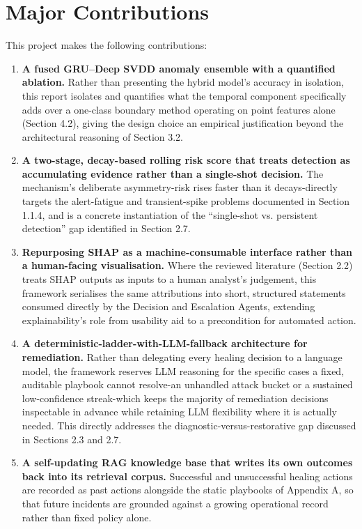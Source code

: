 \section{Major Contributions}

This project makes the following contributions:

\begin{enumerate}
\item \textbf{A fused GRU--Deep SVDD anomaly ensemble with a quantified ablation.} Rather than presenting the hybrid model's accuracy in isolation, this report isolates and quantifies what the temporal component specifically adds over a one-class boundary method operating on point features alone (Section 4.2), giving the design choice an empirical justification beyond the architectural reasoning of Section 3.2.

\item \textbf{A two-stage, decay-based rolling risk score that treats detection as accumulating evidence rather than a single-shot decision.} The mechanism's deliberate asymmetry-risk rises faster than it decays-directly targets the alert-fatigue and transient-spike problems documented in Section 1.1.4, and is a concrete instantiation of the ``single-shot vs. persistent detection'' gap identified in Section 2.7.

\item \textbf{Repurposing SHAP as a machine-consumable interface rather than a human-facing visualisation.} Where the reviewed literature (Section 2.2) treats SHAP outputs as inputs to a human analyst's judgement, this framework serialises the same attributions into short, structured statements consumed directly by the Decision and Escalation Agents, extending explainability's role from usability aid to a precondition for automated action.

\item \textbf{A deterministic-ladder-with-LLM-fallback architecture for remediation.} Rather than delegating every healing decision to a language model, the framework reserves LLM reasoning for the specific cases a fixed, auditable playbook cannot resolve-an unhandled attack bucket or a sustained low-confidence streak-which keeps the majority of remediation decisions inspectable in advance while retaining LLM flexibility where it is actually needed. This directly addresses the diagnostic-versus-restorative gap discussed in Sections 2.3 and 2.7.

\item \textbf{A self-updating RAG knowledge base that writes its own outcomes back into its retrieval corpus.} Successful and unsuccessful healing actions are recorded as past actions alongside the static playbooks of Appendix A, so that future incidents are grounded against a growing operational record rather than fixed policy alone.


\end{enumerate}
